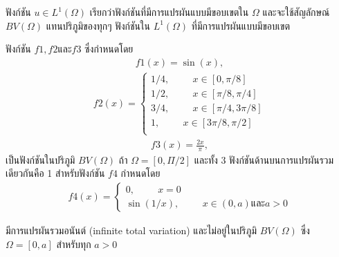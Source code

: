 \hspace{1cm}ฟังก์ชัน $u \in L^1 (\Omega)$ เรียกว่าฟังก์ชันที่มีการแปรผันแบบมีขอบเขตใน $\Omega$ และจะใช้สัญลักษณ์ $BV(\Omega)$ แทนปริภูมิของทุกๆ ฟังก์ชันใน $L^1(\Omega)$ ที่มีการแปรผันแบบมีขอบเขต
\begin{Example}
    ฟังก์ชัน $f1, f2 \text{และ} f3 $ ซึ่งกำหนดโดย
    \begin{align}
        f1(x) = \sin{(x)},
    \end{align}
    \begin{align}
        f2(x) = \left\{
            \begin{array}{ll}
              1/4, \hspace{1cm}  x \in [0,\pi/8] \\
              1/2, \hspace{1cm}  x \in [\pi/8,\pi/4] \\
              3/4, \hspace{1cm}  x \in [\pi/4,3\pi/8] \\
              1, \hspace{1cm}  x \in [3\pi/8,\pi/2] \\
            \end{array}
          \right.
    \end{align}
    \begin{align}
        f3(x) = \frac{2x}{\pi},
    \end{align}
    เป็นฟังก์ชันในปริภูมิ $BV(\Omega)$ ถ้า $\Omega = [0, \Pi/2]$ และทั้ง 3 ฟังก์ชันด้านบนการแปรผันรวมเดียวกันคือ 1 สำหรับฟังก์ชัน $f4$ กำหนดโดย
    \begin{align}
        f4(x) = \left\{ 
            \begin{array}{ll}
                0, \hspace{1cm}  x = 0 \\
                \sin (1/x), \hspace{1cm} x \in (0,a) \text{และ} a > 0
            \end{array}
        \right.
    \end{align}
    
    มีการแปรผันรวมอนันต์ (infinite total variation) และไม่อยู่ในปริภูมิ $BV(\Omega)$ ซึ่ง $\Omega = [0,a]$ สำหรับทุก $a > 0$
    
\end{Example}
